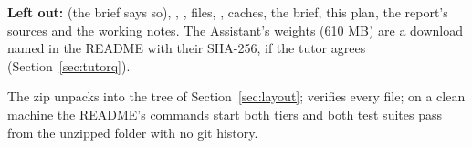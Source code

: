 \textbf{Left out:}  (the brief says so), , ,
 files, , caches, the brief, this plan, the report's sources and the
working notes. The Assistant's weights (610 MB) are a download named in the README with their
SHA-256, if the tutor agrees (Section~\ref{sec:tutorq}).

\begin{done}
The zip unpacks into the tree of Section~\ref{sec:layout};  verifies every file;
on a clean machine the README's commands start both tiers and both test suites pass from the
unzipped folder with no git history.
\end{done}
